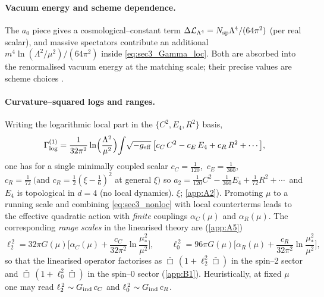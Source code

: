 \documentclass{iopjournal}
\begin{document}
\paragraph{Vacuum energy and scheme dependence.}
The $a_0$ piece gives a cosmological–constant term $\Delta\mathcal L_{\Lambda^4}=N_{\rm sp}\Lambda^4/(64\pi^2)$ (per real scalar), and massive spectators contribute an additional $m^4\ln(\Lambda^2/\mu^2)/(64\pi^2)$ inside \eqref{eq:sec3_Gamma_loc}. Both are absorbed into the renormalised vacuum energy at the matching scale; their precise values are scheme choices \cite{ParkerToms}.

\paragraph{Curvature–squared logs and ranges.}
Writing the logarithmic local part in the $\{C^2,E_4,R^2\}$ basis,
\begin{equation}
\Gamma^{(1)}_{\rm log}
=\frac{1}{32\pi^2}\ln\!\Big(\frac{\Lambda^2}{\mu^2}\Big)\!\int\!\sqrt{-g_{\rm eff}}\,
\big[c_C\,C^2-c_E\,E_4+c_R\,R^2+\cdots\big],
\label{eq:sec3_logs}
\end{equation}
one has for a single minimally coupled scalar $c_C=\tfrac{1}{120}$,\ $c_E=\tfrac{1}{360}$,\ $c_R=\tfrac{1}{72}\ \big(\text{and }c_R=\tfrac12(\xi-\tfrac16)^2$ at general $\xi\big)$ so $a_2=\tfrac{1}{120}C^2-\tfrac{1}{360}E_4+\tfrac{1}{72}R^2+\cdots$\ and $E_4$ is topological in $d=4$ (no local dynamics). $\xi$; \cref{app:A2}). Promoting $\mu$ to a running scale and combining \eqref{eq:sec3_nonloc} with local counterterms leads to the effective quadratic action with \emph{finite} couplings $\alpha_C(\mu)$ and $\alpha_R(\mu)$. The corresponding \emph{range scales} in the linearised theory are (\cref{app:A5})
\begin{equation}
\ell_2^{\,2}=32\pi G(\mu)\Big[\alpha_C(\mu)+\frac{c_C}{32\pi^2}\ln\!\frac{\mu_*^2}{\mu^2}\Big],\qquad
\ell_0^{\,2}=96\pi G(\mu)\Big[\alpha_R(\mu)+\frac{c_R}{32\pi^2}\ln\!\frac{\mu_*^2}{\mu^2}\Big],
\label{eq:sec3_ranges}
\end{equation}
so that the linearised operator factorises as $\bar\Box\,(1+\ell_2^2\bar\Box)$ in the spin–2 sector and $\bar\Box\,(1+\ell_0^2\bar\Box)$ in the spin–0 sector (\cref{app:B1}). Heuristically, at fixed $\mu$ one may read $\ell_2^{\,2}\sim G_{\rm ind}\,c_C$ and $\ell_0^{\,2}\sim G_{\rm ind}\,c_R$.
\end{document}
